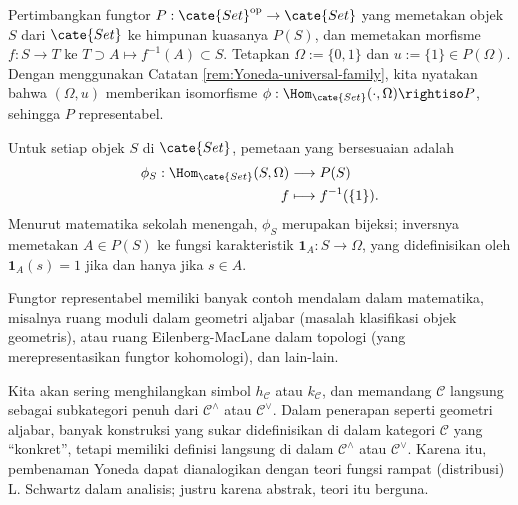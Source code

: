 \begin{example}
	Pertimbangkan fungtor $P: \cate{Set}^\text{op} \to \cate{Set}$ yang memetakan objek $S$ dari $\cate{Set}$ ke himpunan kuasanya $P(S)$, dan memetakan morfisme $f: S \to T$ ke $T \supset A \mapsto f^{-1}(A) \subset S$. Tetapkan $\Omega := \{0, 1\}$ dan $u := \{1\} \in P(\Omega)$. Dengan menggunakan Catatan \ref{rem:Yoneda-universal-family}, kita nyatakan bahwa $(\Omega, u)$ memberikan isomorfisme $ \phi: \Hom_{\cate{Set}}(\cdot, \Omega) \rightiso P$, sehingga $P$ representabel.

	Untuk setiap objek $S$ di $\cate{Set}$, pemetaan yang bersesuaian adalah
	\begin{align*}
		\phi_S: \Hom_{\cate{Set}}(S, \Omega) & \longrightarrow P(S) \\
		f & \longmapsto f^{-1}(\{1\}).
	\end{align*}
	Menurut matematika sekolah menengah, $\phi_S$ merupakan bijeksi; inversnya memetakan $A \in P(S)$ ke fungsi karakteristik $\mathbf{1}_A:  S \to \Omega$, yang didefinisikan oleh $\mathbf{1}_A (s)=1$ jika dan hanya jika $s \in A$.
\end{example}
Fungtor representabel memiliki banyak contoh mendalam dalam matematika, misalnya ruang moduli dalam geometri aljabar (masalah klasifikasi objek geometris), atau ruang Eilenberg-MacLane dalam topologi (yang merepresentasikan fungtor kohomologi), dan lain-lain.

	Kita akan sering menghilangkan simbol $h_{\mathcal{C}}$ atau $k_{\mathcal{C}}$, dan memandang $\mathcal{C}$ langsung sebagai subkategori penuh dari $\mathcal{C}^\wedge$ atau $\mathcal{C}^\vee$. Dalam penerapan seperti geometri aljabar, banyak konstruksi yang sukar didefinisikan di dalam kategori $\mathcal{C}$ yang ``konkret'', tetapi memiliki definisi langsung di dalam $\mathcal{C}^\wedge$ atau $\mathcal{C}^\vee$. Karena itu, pembenaman Yoneda dapat dianalogikan dengan teori fungsi rampat (distribusi) L. Schwartz dalam analisis; justru karena abstrak, teori itu berguna.

